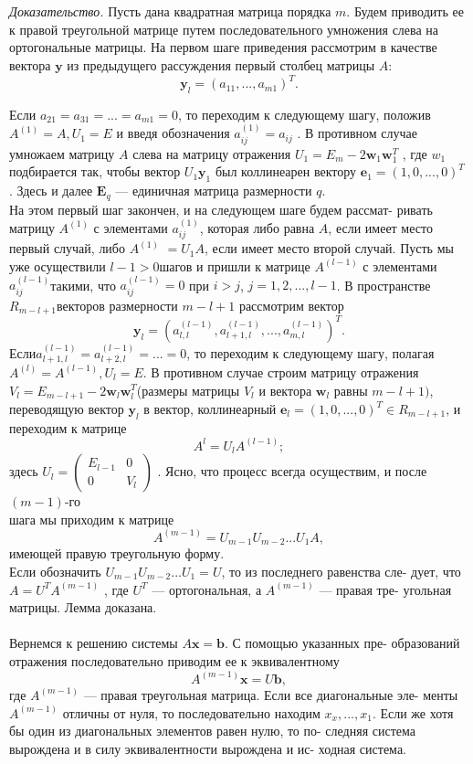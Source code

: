 \documentclass[a4paper, twoside, 12pt]{article}
\begin{document}
\\ \\ 
\textit{Доказательство. } Пусть дана квадратная матрица порядка $m$. Будем приводить ее к правой треугольной матрице путем последовательного умножения слева на ортогональные матрицы. На первом шаге приведения рассмотрим в качестве вектора $\textbf{y}$ из предыдущего рассуждения первый столбец матрицы $A$:
\[\textbf{y}_{l} = (a_{11}, ..., a_{m1})^T.\]

\noindent Если $a_{21} = a_{31} = ... = a_{m1} = 0$, то переходим к следующему шагу, положив $A^{(1)} = A, U_{1} = E$ и введя обозначения $a_{ij}^{(1)} = a_{ij}$ . В противном случае
умножаем матрицу $A$ слева на матрицу отражения $U_{1} = E_{m} - 2\textbf{w}_{1}\textbf{w}_{1}^T$ , где $w_{1}$ подбирается так, чтобы вектор $U_{1}\textbf{y}_{1}$ был коллинеарен вектору $\textbf{e}_{1} = (1, 0, ... , 0)^T$ . Здесь и далее $\textbf{E}_{q}$ — единичная матрица размерности $q$.
\\
\indent
На этом первый шаг закончен, и на следующем шаге будем рассмат- ривать матрицу $A^{(1)}$ с элементами $a_{ij}^{(1)}$, которая либо равна $A$, если имеет
место первый случай, либо $A^{(1)}$ $= U_{1}A$, если имеет место второй случай. Пусть мы уже осуществили $l−1 > 0 $шагов и пришли к матрице $A^{(l−1)}$
с элементами $a_{ij}^{(l−1)}$такими, что $a_{ij}^{(l−1)} = 0$ при $i > j$, $j = 1, 2,..., l−1$. В 
пространстве $R_{m−l+1} $векторов размерности $m − l + 1$ рассмотрим вектор
\[
\textbf{y}_{l} = \left(a_{l,l}^{(l-1)}, a_{l + 1,l}^{(l-1)}, ..., a_{m,l}^{(l-1)}\right)^T.
\]
Если$a_{l + 1,l}^{(l-1)} = a_{l + 2,l}^{(l-1)} =... = 0$, то переходим к следующему шагу, полагая
$A^{(l)} = A^{(l−1)}, U_{l} = E.$ В противном случае строим матрицу отражения $V_{l} = E_{m-l+1} - 2\textbf{w}_{l}\textbf{w}_{l}^T $(размеры матрицы $V_{l}$ и вектора $\textbf{w}_{l}$ равны $m - l + 1)$, переводящую вектор $\textbf{y}_{l}$ в вектор, коллинеарный $\textbf{e}_{l} = (1, 0, ..., 0)^T \in  R_{m-l+1}$, и переходим к матрице
\[A^{l} = U_{l}A^{(l-1)};\]
здесь
$ U_{l} = 
\left(
\begin{array}{ccc}
E_{l-1} & 0 \\
0 & V_{l}
\end{array}
\right)$ . Ясно, что процесс всегда осуществим, и после
$(m-1)$-го \\ 
шага мы приходим к матрице
\[
A^{(m-1)} = U_{m-1}U_{m-2}...U_{1}A, 
\]
имеющей правую треугольную форму.
\\
\indent
Если обозначить $U_{m-1}U_{m-2}...U_{1} =U$, то из последнего равенства сле-
дует, что $A = U^T A^{(m−1)}$ , где $U^T$ — ортогональная, а $A^{(m-1)}$ — правая тре- угольная матрицы. Лемма доказана.
\\  \\ 
\indent
Вернемся к решению системы $A\textbf{x} = \textbf{b}$. С помощью указанных пре- образований отражения последовательно приводим ее к эквивалентному
\[
A^{(m-1)}\textbf{x} = U \textbf{b},
\]
где $A^{(m-1)}$ — правая треугольная матрица. Если все диагональные эле- менты $A^{(m-1)}$ отличны от нуля, то последовательно находим $x_{x}, ..., x_{1}$. Если же хотя бы один из диагональных элементов равен нулю, то по- следняя система вырождена и в силу эквивалентности вырождена и ис- ходная система.
\end{document}
